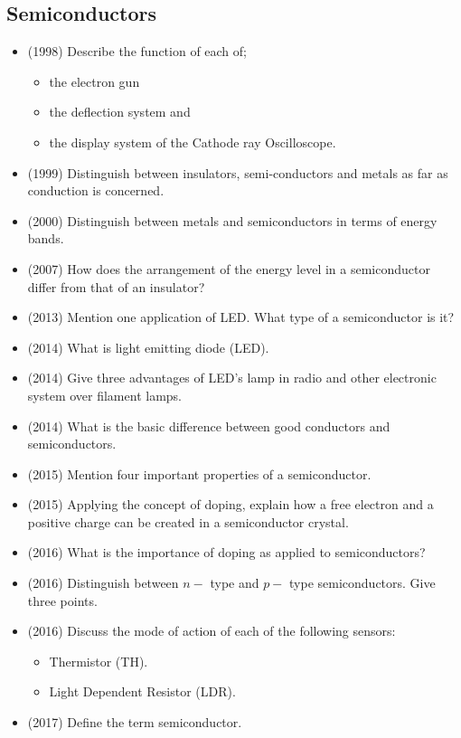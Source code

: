 \documentclass{article}
\begin{document}
\subsection{Semiconductors}
\begin{itemize}
\item (1998)  Describe the function of each of;\begin{itemize}
\item the electron gun
\item the deflection system and
\item the display system of the Cathode ray Oscilloscope.
\end{itemize}
\item (1999)  Distinguish between insulators, semi-conductors and metals as far as conduction is concerned.
\item (2000)  Distinguish between metals and semiconductors in terms of energy bands. 
\item (2007)  How does the arrangement of the energy level in a semiconductor differ from that of an insulator?
\item (2013)  Mention one application of LED. What type of a semiconductor is it?
\item (2014)  What is light emitting diode (LED).
\item (2014)  Give three advantages of LED's lamp in radio and other electronic system over filament lamps.
\item (2014)  What is the basic difference between good conductors and semiconductors.
\item (2015)  Mention four important properties of a semiconductor.
\item (2015)  Applying the concept of doping, explain how a free electron and a positive charge can be created in a semiconductor crystal. 
\item (2016)  What is the importance of doping as applied to semiconductors?
\item (2016)  Distinguish between $ n-$ type and $ p-$ type semiconductors.  Give three points.
\item (2016)  Discuss the mode of action of each of the following sensors:\begin{itemize}
\item Thermistor (TH).
\item Light Dependent Resistor (LDR).
\end{itemize}
\item (2017)  Define the term semiconductor.\begin{itemize}

\end{itemize}
\end{itemize}
\end{document}
